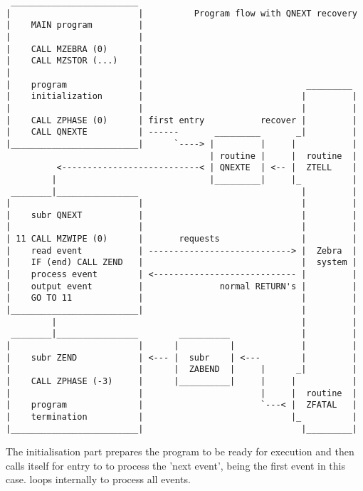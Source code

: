 \newpage
\begin{verbatim}
 _________________________
|                         |          Program flow with QNEXT recovery
|    MAIN program         |
|                         |
|    CALL MZEBRA (0)      |
|    CALL MZSTOR (...)    |
|                         |
|    program              |                                _________
|    initialization       |                               |         |
|                         |                               |         |
|    CALL ZPHASE (0)      | first entry           recover |         |
|    CALL QNEXTE          | ------       _________       _|         |
|_________________________|      `----> |         |     |           |
                                        | routine |     |  routine  |
          <---------------------------< | QNEXTE  | <-- |  ZTELL    |
         |                              |_________|     |_          |
 ________|________________                                |         |
|                         |                               |         |
|    subr QNEXT           |                               |         |
|                         |                               |         |
| 11 CALL MZWIPE (0)      |       requests                |         |
|    read event           | ----------------------------> |  Zebra  |
|    IF (end) CALL ZEND   |                               |  system |
|    process event        | <---------------------------- |         |
|    output event         |               normal RETURN's |         |
|    GO TO 11             |                               |         |
|_________________________|                               |         |
         |                                                |         |
 ________|________________        __________              |         |
|                         |      |          |             |         |
|    subr ZEND            | <--- |  subr    | <---        |         |
|                         |      |  ZABEND  |     |      _|         |
|    CALL ZPHASE (-3)     |      |__________|     |     |           |
|                         |                       |     |  routine  |
|    program              |                       `---< |  ZFATAL   |
|    termination          |                             |_          |
|_________________________|                               |_________|

\end{verbatim} 
The initialisation part prepares the program to be ready
for execution and then calls itself 
 for entry to 
to process the 'next event',
being the first event in this case.
 loops internally to process all events.

